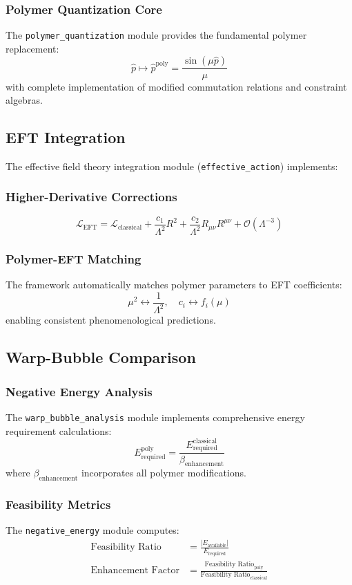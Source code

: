 \documentclass[11pt]{article}
\begin{document}
\subsubsection{Polymer Quantization Core}
The \texttt{polymer\_quantization} module provides the fundamental polymer replacement:
\[
\hat{p} \mapsto \hat{p}^{\text{poly}} = \frac{\sin(\mu \hat{p})}{\mu}
\]
with complete implementation of modified commutation relations and constraint algebras.

\subsection{EFT Integration}

The effective field theory integration module (\texttt{effective\_action}) implements:

\subsubsection{Higher-Derivative Corrections}
\[
\mathcal{L}_{\text{EFT}} = \mathcal{L}_{\text{classical}} + \frac{c_1}{\Lambda^2} R^2 + \frac{c_2}{\Lambda^2} R_{\mu\nu} R^{\mu\nu} + \mathcal{O}(\Lambda^{-3})
\]

\subsubsection{Polymer-EFT Matching}
The framework automatically matches polymer parameters to EFT coefficients:
\[
\mu^2 \leftrightarrow \frac{1}{\Lambda^2}, \quad c_i \leftrightarrow f_i(\mu)
\]
enabling consistent phenomenological predictions.

\subsection{Warp-Bubble Comparison}

\subsubsection{Negative Energy Analysis}
The \texttt{warp\_bubble\_analysis} module implements comprehensive energy requirement calculations:
\[
E_{\text{required}}^{\text{poly}} = \frac{E_{\text{required}}^{\text{classical}}}{\beta_{\text{enhancement}}}
\]
where $\beta_{\text{enhancement}}$ incorporates all polymer modifications.

\subsubsection{Feasibility Metrics}
The \texttt{negative\_energy} module computes:
\begin{align}
\text{Feasibility Ratio} &= \frac{|E_{\text{available}}|}{E_{\text{required}}} \\
\text{Enhancement Factor} &= \frac{\text{Feasibility Ratio}_{\text{poly}}}{\text{Feasibility Ratio}_{\text{classical}}}
\end{align}
\end{document}
